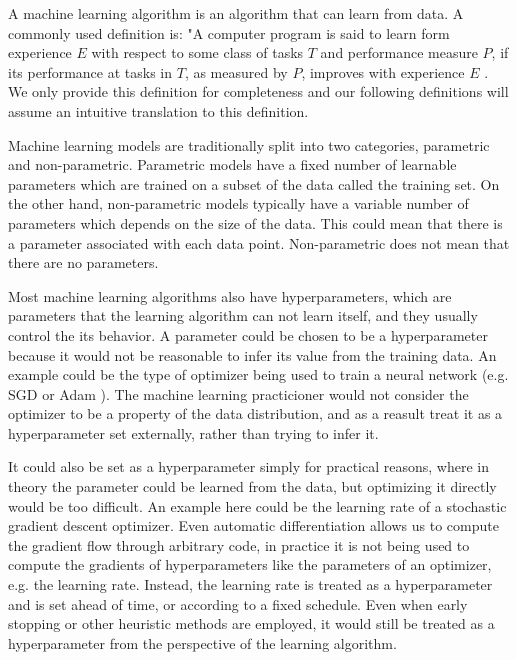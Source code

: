 A machine learning algorithm is an algorithm that can learn from data. A
commonly used definition is: "A computer program is said to learn form
experience $E$ with respect to some class of tasks $T$ and performance measure
$P$, if its performance at tasks in $T$, as measured by $P$, improves with
experience $E$ \citep{mitchell-mldef}. We only provide this definition for
completeness and our following definitions will assume an intuitive translation
to this definition.

Machine learning models are traditionally split into two categories, parametric
and non-parametric. Parametric models have a fixed number of learnable parameters
which are trained on a subset of the data called the training set. On the other hand,
non-parametric models typically have a variable number of parameters which depends on
the size of the data. This could mean that there is a parameter associated with each
data point. Non-parametric does not mean that there are no parameters.

Most machine learning algorithms also have hyperparameters, which are
parameters that the learning algorithm can not learn itself, and they usually
control the its behavior. A parameter could be chosen to be a hyperparameter
because it would not be reasonable to infer its value from the training data.
An example could be the type of optimizer being used to train a neural network
(e.g. SGD or Adam \citep{kingma2014adam}). The machine learning practicioner
would not consider the optimizer to be a property of the data distribution, and
as a reasult treat it as a hyperparameter set externally, rather than trying to
infer it.

It could also be set as a hyperparameter simply for practical reasons, where in
theory the parameter could be learned from the data, but optimizing it directly
would be too difficult. An example here could be the learning rate of a
stochastic gradient descent optimizer. Even automatic differentiation
\citep{maclaurin2015autograd} allows us to compute the gradient flow through arbitrary code,
in practice it is not being used to compute the gradients of hyperparameters
like the parameters of an optimizer, e.g. the learning rate. Instead, the
learning rate is treated as a hyperparameter and is set ahead of time, or
according to a fixed schedule. Even when early stopping or
other heuristic methods are employed, it would still be treated as a
hyperparameter from the perspective of the learning algorithm.

